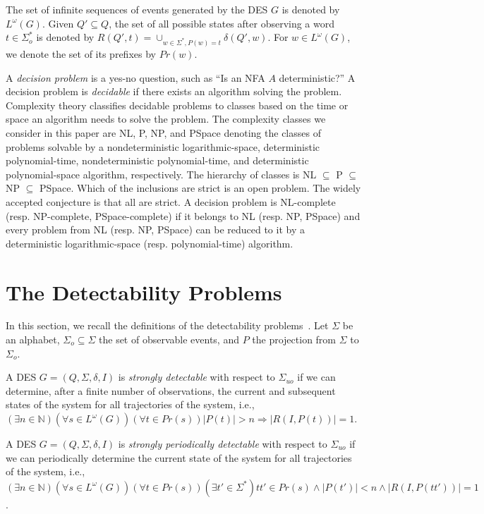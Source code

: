 \documentclass[twocolumn,amsthm]{autartx}
\begin{document}
  The set of infinite sequences of events generated by the DES $G$ is denoted by $L^\omega (G)$. Given $Q' \subseteq Q$, the set of all possible states after observing a word $t \in \Sigma_o^*$ is denoted by 
    $R(Q',t) = \cup_{w \in \Sigma^*, P(w) = t} \delta(Q',w)$.
  For $w \in L^\omega (G)$, we denote the set of its prefixes by $Pr(w)$.

  A {\em decision problem\/} is a yes-no question, such as ``Is an NFA $A$ deterministic?'' A decision problem is {\em decidable\/} if there exists an algorithm solving the problem. Complexity theory classifies decidable problems to classes based on the time or space an algorithm needs to solve the problem. The complexity classes we consider in this paper are NL, P, NP, and PSpace denoting the classes of problems solvable by a nondeterministic logarithmic-space, deterministic polynomial-time, nondeterministic polynomial-time, and deterministic polynomial-space algorithm, respectively. The hierarchy of classes is NL $\subseteq$ P $\subseteq$ NP $\subseteq$ PSpace. Which of the inclusions are strict is an open problem. The widely accepted conjecture is that all are strict. A decision problem is NL-complete (resp. NP-complete, PSpace-complete) if it belongs to NL (resp. NP, PSpace) and every problem from NL (resp. NP, PSpace) can be reduced to it by a deterministic logarithmic-space (resp. polynomial-time) algorithm.

  
\section{The Detectability Problems}
  In this section, we recall the definitions of the detectability problems~\cite{ShuLin2011}. Let $\Sigma$ be an alphabet, $\Sigma_o\subseteq\Sigma$ the set of observable events, and $P$ the projection from $\Sigma$ to $\Sigma_o$.
  
  \begin{defn}
    A DES $G=(Q,\Sigma,\delta,I)$ is {\em strongly detectable\/} with respect to $\Sigma_{uo}$ if we can determine, after a finite number of observations, the current and subsequent states of the system for all trajectories of the system, i.e., $(\exists n \in \mathbb{N})(\forall s \in L^\omega(G))(\forall t \in Pr(s)) |P(t)| > n \Rightarrow |R(I,P(t))| = 1$.
  \end{defn}

  \begin{defn}
    A DES $G=(Q,\Sigma,\delta,I)$ is {\em strongly periodically detectable\/} with respect to $\Sigma_{uo}$ if we can periodically determine the current state of the system for all trajectories of the system, i.e., $(\exists n \in \mathbb{N})(\forall s \in L^\omega(G))(\forall t \in Pr(s))(\exists t' \in \Sigma^*) tt'\in Pr(s) \land |P(t')| < n \land |R(I,P(tt'))| = 1$.
  \end{defn}
\end{document}

